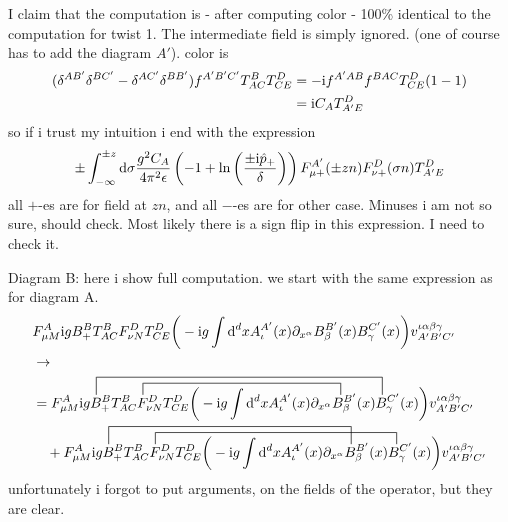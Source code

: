 I claim that the computation is - after computing color - 100\% identical to the computation for twist 1. The intermediate field is simply ignored. (one of course has to add the diagram $A'$).
color is 
\begin{align}
	(\delta^{AB'} \delta^{BC'} -\delta^{AC'}\delta^{BB'}) f^{A'B'C'} T^{B}_{AC} T^{D}_{CE}
	&= - \text{i} f^{A'AB}f^{BAC} T^D_{CE}(1-1)
	\\
	&=
	\text{i} C_A T_{A'E}^D
\end{align}
so if i trust my intuition i end with the expression
\begin{align}
	\pm\int_{-\infty}^{\pm z} \text{d} \sigma\frac{  g^2 C_A}{4\pi^2 \epsilon} \left(-1+\ln\left(\frac{\pm\text{i} \hat p_{+}}{\delta}\right)\right)
	F_{\mu +}^{A'}(\pm zn)F_{\nu +}^D(\sigma n)T^D_{A'E}
\end{align}
all $+$-es are for field at $zn$, and all $-$-es are for other case. Minuses i am not so sure, should check. Most likely there is a sign flip in this expression. 
I need to check it.

Diagram B:
here i show full computation.
we start with the same expression as for diagram A. 
\begin{align}
	&\ft_{\mu M}^{A} \imag g B_+^B  T^B_{AC} \ft _{\nu N}^D T^D_{CE}\bigg(-\imag g \int \ddx xA_\iota^{A'}(x) \partial_{x^\alpha} B_\beta^{B'} (x) B_\gamma^{C'}(x) \bigg) v^{\iota \alpha\beta\gamma}_{A'B'C'}
	\\
	&\rightarrow
	\\
	&=
	\contraction[2ex]{\ft_{\mu M}^{A} \imag g B_+^B  T^B_{AC} }{\ft}{_{\nu N}^D T^D_{CE}\bigg(-\imag g \int \ddx xA_\iota^{A'}(x) \partial_{x^\alpha}}{B}
	\contraction[3ex]{\ft_{\mu M}^{A} \imag g}{B}{_+^B  T^B_{AC} \ft _{\nu N}^D T^D_{CE}\bigg(-\imag g \int \ddx xA_\iota^{A'}(x) \partial_{x^\alpha} B_\beta^{B'} (x)}{B}
	\ft_{\mu M}^{A} \imag g B_+^B  T^B_{AC} \ft _{\nu N}^D T^D_{CE}\bigg(-\imag g \int \ddx xA_\iota^{A'}(x) \partial_{x^\alpha} B_\beta^{B'} (x) B_\gamma^{C'}(x) \bigg) v^{\iota \alpha\beta\gamma}_{A'B'C'}
	\nl
	\contraction[3ex]{+\ft_{\mu M}^{A} \imag g }{B}{_+^B  T^B_{AC} \ft _{\nu N}^D T^D_{CE}\bigg(-\imag g \int \ddx xA_\iota^{A'}(x) \partial_{x^\alpha}}{B}
	\contraction[2ex]{+\ft_{\mu M}^{A} \imag g B_+^B  T^B_{AC}}{\ft}{_{\nu N}^D T^D_{CE}\bigg(-\imag g \int \ddx xA_\iota^{A'}(x) \partial_{x^\alpha} B_\beta^{B'} (x)}{B}
	+\ft_{\mu M}^{A} \imag g B_+^B  T^B_{AC} \ft _{\nu N}^D T^D_{CE}\bigg(-\imag g \int \ddx xA_\iota^{A'}(x) \partial_{x^\alpha} B_\beta^{B'} (x) B_\gamma^{C'}(x) \bigg) v^{\iota \alpha\beta\gamma}_{A'B'C'}
\end{align}
unfortunately i forgot to put arguments, on the fields of the operator, but they are clear.

